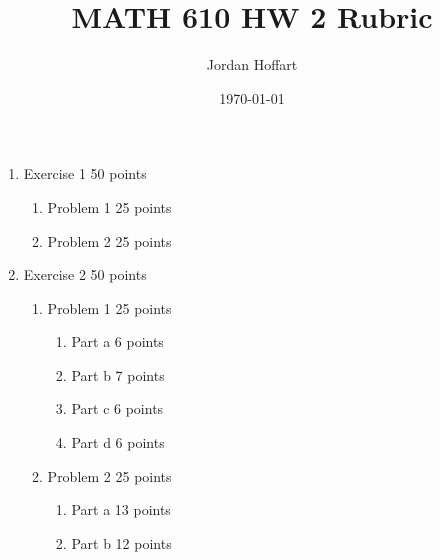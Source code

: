\documentclass{article}
\title{MATH 610 HW 2 Rubric}
\author{Jordan Hoffart}
\date{\today}
\begin{document}
\maketitle

\begin{enumerate}
  \item Exercise 1 50 points
    \begin{enumerate}
      \item Problem 1 25 points
      \item Problem 2 25 points
    \end{enumerate}
  \item Exercise 2 50 points
    \begin{enumerate}
      \item Problem 1 25 points
        \begin{enumerate}
          \item Part a 6 points
          \item Part b 7 points
          \item Part c 6 points
          \item Part d 6 points
        \end{enumerate}
      \item Problem 2 25 points
        \begin{enumerate}
          \item Part a 13 points
          \item Part b 12 points
        \end{enumerate}
    \end{enumerate}
\end{enumerate}
\end{document}
